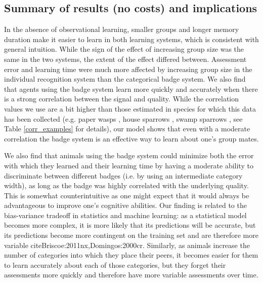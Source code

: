 \subsection*{Summary of results (no costs) and implications} %
In the absence of observational learning, smaller groups and longer memory duration make it easier to learn in both learning systems, which is consistent with general intuition. While the sign of the effect of increasing group size was the same in the two systems, the extent of the effect differed between. Assessment error and learning time were much more affected by increasing group size in the individual recognition system than the categorical badge system. We also find that agents using the badge system learn more quickly and accurately when there is a strong correlation between the signal and quality. While the correlation values we use are a bit higher than those estimated in species for which this data has been collected (e.g. paper wasps \cite{Tibbetts:2004kx}, house sparrows \cite{Veiga:1993fk}, swamp sparrows \cite{Olsen:2010uq}, see Table \ref{corr_examples} for details), our model shows that even with a moderate correlation the badge system is an effective way to learn about one's group mates. 


We also find that animals using the badge system could minimize both the error with which they learned and their learning time by having a moderate ability to discriminate between different badges (i.e. by using an intermediate category width), as long as the badge was highly correlated with the underlying quality. This is somewhat counterintuitive as one might expect that it would always be advantageous to improve one's cognitive abilities. Our finding is related to the bias-variance tradeoff in statistics and machine learning: as a statistical model becomes more complex, it is more likely that its predictions will be accurate, but its predictions become more contingent on the training set and are therefore more variable cite{Briscoe:2011nx,Domingos:2000cr}. Similarly, as animals increase the number of categories into which they place their peers, it becomes easier for them to learn accurately about each of those categories, but they forget their assessments more quickly and therefore have more variable assessments over time. 

